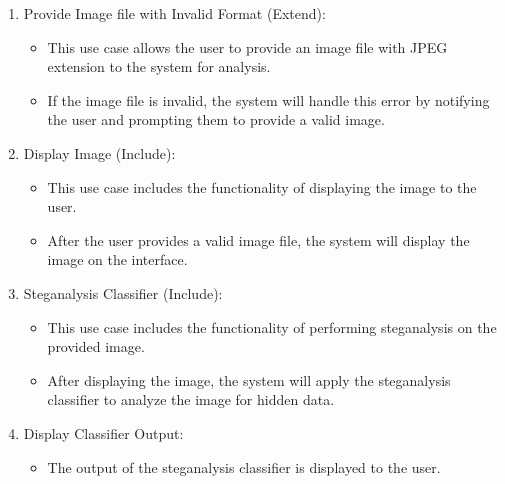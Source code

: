 \begin{enumerate}[noitemsep]
    \item Provide Image file with Invalid Format (Extend):
    \begin{itemize}
        \item This use case allows the user to provide an image file with JPEG extension to the system for analysis.
        \item If the image file is invalid, the system will handle this error by notifying the user and prompting them to provide a valid image.
    \end{itemize}
    \clearpage
    \item Display Image (Include):
    \begin{itemize}
        \item This use case includes the functionality of displaying the image to the user.
        \item After the user provides a valid image file, the system will display the image on the interface.
    \end{itemize}
    
    \item Steganalysis Classifier (Include):
    \begin{itemize}
        \item This use case includes the functionality of performing steganalysis on the provided image.
        \item After displaying the image, the system will apply the steganalysis classifier to analyze the image for hidden data.
    \end{itemize}
    
    \item Display Classifier Output:
    \begin{itemize}
        \item The output of the steganalysis classifier is displayed to the user.
    \end{itemize}
\end{enumerate}

